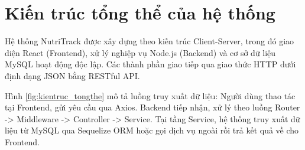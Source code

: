 \documentclass[12pt, a4paper]{report}
\begin{document}
\section{Kiến trúc tổng thể của hệ thống}
Hệ thống NutriTrack được xây dựng theo kiến trúc Client-Server, trong đó giao diện React (Frontend), xử lý nghiệp vụ Node.js (Backend) và cơ sở dữ liệu MySQL hoạt động độc lập. Các thành phần giao tiếp qua giao thức HTTP dưới định dạng JSON bằng RESTful API.

Hình \ref{fig:kientruc_tongthe} mô tả luồng truy xuất dữ liệu: Người dùng thao tác tại Frontend, gửi yêu cầu qua Axios. Backend tiếp nhận, xử lý theo luồng Router -> Middleware -> Controller -> Service. Tại tầng Service, hệ thống truy xuất dữ liệu từ MySQL qua Sequelize ORM hoặc gọi dịch vụ ngoài rồi trả kết quả về cho Frontend.
\end{document}
